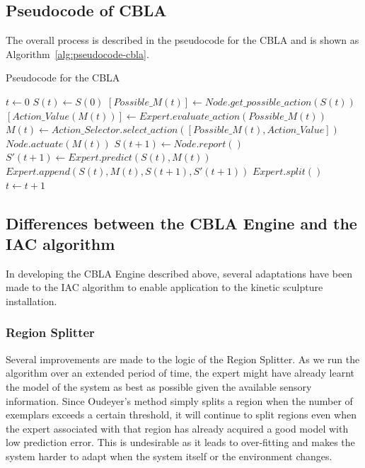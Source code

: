 \subsection{Pseudocode of CBLA}
	
The overall process is described in the pseudocode for the CBLA and is shown as Algorithm~\ref{alg:pseudocode-cbla}.

\begin{algorithm}[H]
	\caption{Pseudocode for the CBLA} 
	\label{alg:pseudocode-cbla}
	\begin{algorithmic} [1]
		\State $t\gets 0$
		\State $S(t)\gets S(0)$
		\Loop
			\State $[Possible\_M(t)] \gets Node.get\_possible\_action(S(t)) $
			\State $[Action\_Value(M(t))] \gets Expert.evaluate\_action(Possible\_M(t))$
			\State $M(t) \gets Action\_Selector.select\_action([Possible\_M(t), Action\_Value]) $
			\State $Node.actuate(M(t)) $
			\State $S(t+1) \gets Node.report()$
			\State $S'(t+1) \gets Expert.predict(S(t), M(t))$
			\State $Expert.append(S(t), M(t), S(t+1), S'(t+1))$
			\State $Expert.split()$
			\State $t \gets t + 1 $
		\EndLoop
	\end{algorithmic}
\end{algorithm}


\subsection{Differences between the CBLA Engine and the IAC algorithm}

In developing the CBLA Engine described above, several adaptations have been made to the IAC algorithm to enable application to the kinetic sculpture installation. 

\subsubsection{Region Splitter}

Several improvements are made to the logic of the Region Splitter. As we run the algorithm over an extended period of time, the expert might have already learnt the model of the system as best as possible given the available sensory information. Since Oudeyer's method simply splits a region when the number of exemplars exceeds a certain threshold, it will continue to split regions even when the expert associated with that region has already acquired a good model with low prediction error. This is undesirable as it leads to over-fitting and makes the system harder to adapt when the system itself or the environment changes. 

